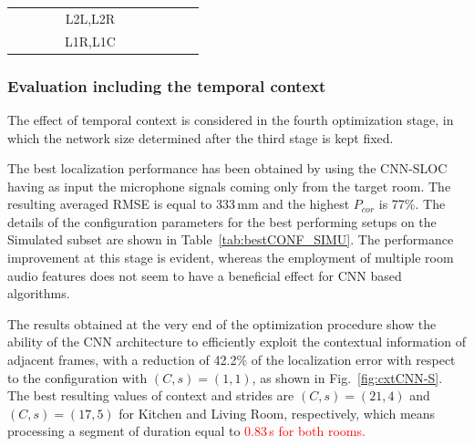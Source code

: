 \documentclass[review]{elsarticle}
\newcommand{\figref}[1]{Fig.~\ref{#1}}
\newcommand{\tableref}[1]{Table~\ref{#1}}
\begin{document}
\begin{table}[!h]
{\begin{tabular}{c|cc|cc|cc|cc|cc}
		&                                &                          &                                                                            & L2L,L2R               &                                         &                                             &                      &                      &                      &                     \\
		&                                &                          &                                                                            & L1R,L1C               &                                         &                                             &                      &                      &                      &                     \\
	\end{tabular}
	}
\end{table}

\subsubsection{Evaluation including the temporal context}


The effect of temporal context is considered in the fourth optimization stage, in which the network size determined after the third stage is kept fixed. %

The best localization performance has been obtained by using the CNN-SLOC having as input the microphone signals coming only from the target room. The resulting averaged RMSE is equal to 333\,mm and the highest $P_{cor}$ is 77\%. The details of the configuration parameters for the best performing setups on the Simulated subset are shown in \tableref{tab:bestCONF_SIMU}. The performance improvement at this stage is evident, whereas the employment of multiple room audio features does not seem to have a beneficial effect for CNN based algorithms. 

The results obtained at the very end of the optimization procedure show the ability of the CNN architecture to efficiently exploit the contextual information of adjacent frames, with a reduction of 42.2\% of the localization error with respect to the configuration with $(C,s)=(1,1)$, as shown in \figref{fig:cxtCNN-S}. 
The best resulting values of context and strides are $(C,s)=(21,4)$ and $(C,s)=(17,5)$ for Kitchen and Living Room, respectively, which means processing a segment of duration equal to \textcolor{red}{0.83\,s for both rooms.} 
\end{document}
